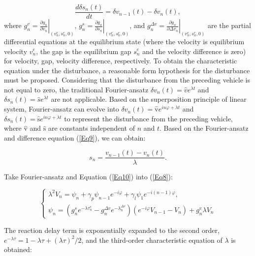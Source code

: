 \documentclass[journal]{IEEEtran}
\begin{document}
\begin{equation}
\frac{d \delta s_{n}(t)}{d t}=\delta v_{n-1}(t)-\delta v_{n}(t),
\label{Eq9}
\end{equation}
where $g_{n}^{v}=\left.\frac{\partial g_{n}}{\partial v_{n}}\right|_{\left(v_{n}^{e}, s_{n}^{e}, 0\right)}$, $g_{n}^{s}=\left.\frac{\partial g_{n}}{\partial s_{n}}\right|_{\left(v_{n}^{e}, s_{n}^{e}, 0\right)}$, and $g_{n}^{\Delta v}=\left.\frac{\partial g_{n}}{\partial \Delta v_{n}}\right|_{\left(v_{n}^{e}, s_{n}^{e}, 0\right)}$ are the partial differential equations at the equilibrium state (where the velocity is equilibrium velocity $v_{n}^{e}$, the gap is the equilibrium gap $s_{n}^{e}$ and the velocity difference is zero) for velocity, gap, velocity difference, respectively. To obtain the characteristic equation under the disturbance, a reasonable form hypothesis for the disturbance must be proposed. Considering that the disturbance from the preceding vehicle is not equal to zero, the traditional Fourier-ansatz $\delta v_{n}(t)=\hat{v} e^{\lambda t}$ and $\delta s_{n}(t)=\hat{s} e^{\lambda t}$ are not applicable. Based on the superposition principle of linear system, Fourier-ansatz can evolve into $\delta v_{n}(t)=\hat{\mathrm{v}} e^{i n \varphi+\lambda t}$ and $\delta s_{n}(t)=\hat{\mathrm{s}} e^{i n \varphi+\lambda t}$ to represent the disturbance from the preceding vehicle, where $\hat{\mathrm{v}}$ and $\hat{\mathrm{s}}$ are constants independent of $n$ and $t$. Based on the Fourier-ansatz and difference equation (\ref{Eq9}), we can obtain:

\begin{equation}
s_{n}=\frac{v_{n-1}(t)-v_{n}(t)}{\lambda}.
\label{Eq10}
\end{equation}

Take Fourier-ansatz and Equation (\ref{Eq10}) into (\ref{Eq8}):


\begin{equation}
  \left\{\begin{array}{c}
  \lambda^{2}V_{n}=\psi_{n}+\gamma_{p} \psi_{n-1} e^{-i \varphi}+\gamma_{l} \psi_{1} e^{-i(n-1) \varphi}, \\
  \psi_{n}=\left(g_{n}^{s} e^{-\lambda \tau_{n}^{s}}-g_{n}^{\Delta v} e^{-\lambda_{n}^{\Delta v}}\right)\left(e^{-i \varphi}V_{n-1}-V_{n}\right)+g_{n}^{v} \lambda V_{n}
  \end{array}\right.
  \label{Eq11}
\end{equation}

The reaction delay term is exponentially expanded to the second order, $e^{-\lambda \tau}=1-\lambda \tau+ ({\lambda \tau})^2/2$, and the third-order characteristic equation of $\lambda$ is obtained:
\end{document}
